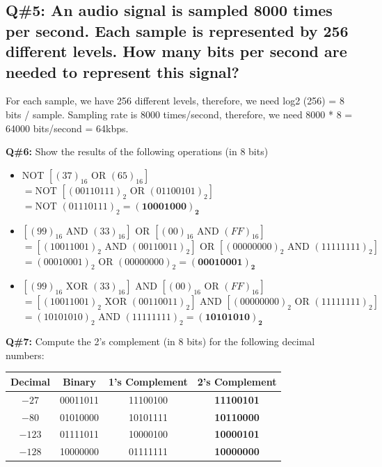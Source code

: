 \subsection{Q\#5: An audio signal is sampled 8000 times per second. Each sample is represented by 256 different
levels. How many bits per second are needed to represent this signal?}
For each sample, we have 256 different levels, therefore, we need log2 (256) = 8 bits / sample.
Sampling rate is 8000 times/second, therefore, we need 8000 * 8 = 64000 bits/second = 64kbps.
\vspace{1.5em}


\textbf{Q\#6:} Show the results of the following operations (in 8 bits)

\begin{itemize}
  \item[a)] NOT $[(37)_{16} \text{ OR } (65)_{16}]$ \\
  \quad $= \text{NOT } [(00110111)_2 \text{ OR } (01100101)_2]$ \\
  \quad $= \text{NOT } (01110111)_2 = \mathbf{(10001000)_2}$

  \item[b)] $[(99)_{16} \text{ AND } (33)_{16}] \text{ OR } [(00)_{16} \text{ AND } (FF)_{16}]$ \\
  \quad $= [(10011001)_2 \text{ AND } (00110011)_2] \text{ OR } [(00000000)_2 \text{ AND } (11111111)_2]$ \\
  \quad $= (00010001)_2 \text{ OR } (00000000)_2 = \mathbf{(00010001)_2}$

  \item[c)] $[(99)_{16} \text{ XOR } (33)_{16}] \text{ AND } [(00)_{16} \text{ OR } (FF)_{16}]$ \\
  \quad $= [(10011001)_2 \text{ XOR } (00110011)_2] \text{ AND } [(00000000)_2 \text{ OR } (11111111)_2]$ \\
  \quad $= (10101010)_2 \text{ AND } (11111111)_2 = \mathbf{(10101010)_2}$
\end{itemize}

\textbf{Q\#7:} Compute the 2's complement (in 8 bits) for the following decimal numbers:

\begin{center}
\begin{tabular}{|c|c|c|c|}
\hline
\textbf{Decimal} & \textbf{Binary} & \textbf{1's Complement} & \textbf{2's Complement} \\
\hline
$-27$ & 00011011 & 11100100 & \textbf{11100101} \\
$-80$ & 01010000 & 10101111 & \textbf{10110000} \\
$-123$ & 01111011 & 10000100 & \textbf{10000101} \\
$-128$ & 10000000 & 01111111 & \textbf{10000000} \\
\hline
\end{tabular}
\end{center}

